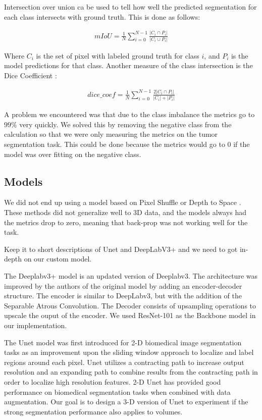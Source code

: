 \documentclass[10pt,twocolumn,letterpaper]{article}
\begin{document}
Intersection over union \cite{MET}  ca be used to tell how well  the predicted segmentation for each class intersects with ground truth. This is done as follows:

\begin{align}
mIoU = \frac{1}{N} \sum_{i=0}^{N-1} \frac{| C_i \cap P_i|}{|C_i \cup P_i|} 
\end{align}

Where $C_i$ is the set of pixel with labeled ground truth for class $i$, and $P_i$ is the model predictions for that class. Another measure of the class intersection is the Dice Coefficient \cite{MET} :

\begin{align}
dice\_coef = \frac{1}{N} \sum_{i=0}^{N-1} \frac{2| C_i \cap P_i|}{|C_i |+ | P_i|}
\end{align}

A problem we encountered was that due to the class imbalance the metrics go to $99 \%$ very quickly. We solved this by removing the negative class from the calculation so that we were only measuring  the metrics on the tumor segmentation task. This could be done because the metrics would go to 0 if the model was over fitting on the negative class.


\subsection{Models}

We did not end up using a model based on Pixel Shuffle \cite{PIX} or Depth to Space \cite{DEP}. These methods did not generalize well to 3D data, and the models always had the metrics drop to zero, meaning that back-prop was not working well for the task.


Keep it to short descriptions of Unet and DeepLabV3+ and we need to got in-depth on our custom model. 

The Deeplabv3+ model is an updated version of Deeplabv3. The architecture was improved by the authors of the original model by 
 adding an encoder-decoder structure. The encoder is similar to DeepLabv3, but with the addition of the Separable Atrous Convolution. The Decoder consists of upsampling operations to upscale the ouput of the encoder. We used ResNet-101 as the Backbone model in our implementation.
 
The Unet model was first introduced for 2-D biomedical image segmentation tasks as an improvement upon the sliding window approach to localize and label regions around each pixel. Unet utilizes a contracting path to increase output resolution and an expanding path to combine results from the contracting path in order to localize high resolution features. 2-D Unet has provided good performance on biomedical segmentation tasks when combined with data augmentation. Our goal is to design a 3-D version of Unet to experiment if the strong segmentation performance also applies to volumes.
\end{document}
